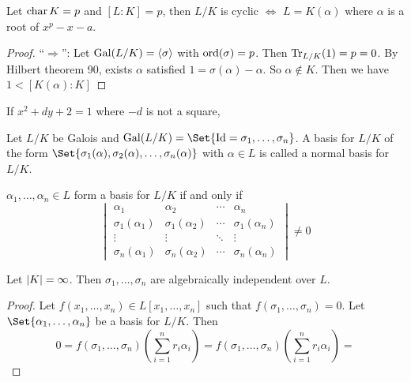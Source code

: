\begin{coro}
  Let $\operatorname{char} K = p$ and $[L: K] = p$, then $L/K$ is cyclic $\iff$ $L = K(\alpha)$ where
  $\alpha$ is a root of $x^p - x - a$.

  \begin{proof}
    ``$\Rightarrow$'': Let $\operatorname{Gal}(L/K) = \langle \sigma \rangle$ with $\operatorname{ord}(\sigma) = p$. Then
    $\operatorname{Tr}_{L/K}(1) = p = 0$. By Hilbert theorem 90, exists $\alpha$ satisfied $1 = \sigma(\alpha) - \alpha$.
    So $\alpha \not\in K$. Then we have $1 < [K(\alpha): K] $
  \end{proof}
\end{coro}

\begin{coro}
  If $x^2 + d y+2 = 1$ where $-d$ is not a square,
\end{coro}

\begin{definition}
  Let $L/K$ be Galois and $\Gal(L/K) = \Set{ \text{Id} = \sigma_1, \dots, \sigma_n }$.
  A basis for $L/K$ of the form $\Set{ \sigma_1(\alpha), \sigma_2(\alpha), \dots, \sigma_n(\alpha)}$
  with $\alpha \in L$ is called  a normal basis for $L/K$.
\end{definition}

\begin{lemma}
  $\alpha_1, \dots, \alpha_n \in L$ form a basis for $L/K$ if and only if
  \[
    \begin{vmatrix}
      \alpha_1 & \alpha_2 & \cdots & \alpha_n \\
      \sigma_1(\alpha_1) & \sigma_1(\alpha_2) & \cdots & \sigma_1(\alpha_n) \\
      \vdots & \vdots & \ddots & \vdots \\
      \sigma_n(\alpha_1) & \sigma_n(\alpha_2) & \cdots & \sigma_n(\alpha_n)
    \end{vmatrix} \neq 0
  \]
\end{lemma}

\begin{lemma}
  Let $\lvert K\rvert = \infty$. Then $\sigma_1, \dots, \sigma_n$ are algebraically independent over $L$.

  \begin{proof}
    Let $f(x_1, \dots, x_n) \in L[x_1, \dots, x_n]$ such that $f(\sigma_1, \dots, \sigma_n) = 0$.
    Let $\Set{\alpha_1, \dots, \alpha_n}$ be a basis for $L/K$. Then
    \[ 0 = f(\sigma_1, \dots, \sigma_n)\left( \sum_{i = 1}^n r_i \alpha_i \right)
      = f(\sigma_1, \dots, \sigma_n)\left( \sum_{i = 1}^n r_i \alpha_i \right)
      = \]
  \end{proof}
\end{lemma}

